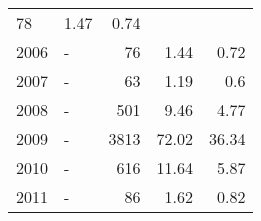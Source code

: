 \begin{longtable}{lXrrr}
       \num{78} &
       \num[round-mode=places,round-precision=2]{1,47} &
         \num[round-mode=places,round-precision=2]{0,74} \\

     2006 &
     \multicolumn{1}{X}{ -  } &


       \num{76} &
       \num[round-mode=places,round-precision=2]{1,44} &
         \num[round-mode=places,round-precision=2]{0,72} \\

     2007 &
     \multicolumn{1}{X}{ -  } &


       \num{63} &
       \num[round-mode=places,round-precision=2]{1,19} &
         \num[round-mode=places,round-precision=2]{0,6} \\

     2008 &
     \multicolumn{1}{X}{ -  } &


       \num{501} &
       \num[round-mode=places,round-precision=2]{9,46} &
         \num[round-mode=places,round-precision=2]{4,77} \\

     2009 &
     \multicolumn{1}{X}{ -  } &


       \num{3813} &
       \num[round-mode=places,round-precision=2]{72,02} &
         \num[round-mode=places,round-precision=2]{36,34} \\

     2010 &
     \multicolumn{1}{X}{ -  } &


       \num{616} &
       \num[round-mode=places,round-precision=2]{11,64} &
         \num[round-mode=places,round-precision=2]{5,87} \\

     2011 &
     \multicolumn{1}{X}{ -  } &


       \num{86} &
       \num[round-mode=places,round-precision=2]{1,62} &
         \num[round-mode=places,round-precision=2]{0,82} \\


\end{longtable}
